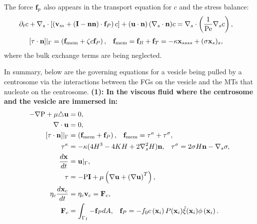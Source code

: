 \documentclass[11pt]{article}
\newcommand{\ff}{\mathbf{f}}
\newcommand{\xx}{\mathbf{x}}
\begin{document}
The force ${\bf f}_p$ also appears in the transport equation  for $c$ and the stress balance:
 \begin{align}
 \label{eq:c_new}
\partial_t c + \nabla_s\cdot \left[ \left({\bf v}_m + \left({\bf I}-{\bf n}{\bf n}\right)\cdot {\bf f}_{P}\right)c\right] + \left({\bf u}\cdot{\bf n}\right) (\nabla_s \cdot{\bf n}) c &= \nabla_s\cdot\left(\frac{1}{\mbox{Pe}}\nabla_s c\right),
\end{align}
\begin{align}
\left[ \tau\cdot{\bf n}\right]\rvert_{\Gamma}  &= \left({\bf f}_{\text{mem}} + \zeta c {\bf f}_P\right),\;\;\; \ff_{\text{mem}} = \ff_B + \ff_T = -\kappa \xx_{ssss} + (\sigma \xx_s)_s, 
\end{align}
where the bulk exchange terms are being neglected.

In summary, below are the governing equations for a vesicle being pulled by a centrosome via the interactions between the FGs on the vesicle and the MTs that nucleate on the centrosome.
%
%
%
\noindent
{\bf (1):  In the viscous fluid where the centrosome and the vesicle are immersed in:}
 \begin{align}
-\nabla \mbox{P} + \mu \triangle {\bf u} &=0,\\
\nabla\cdot{\bf u} & =0,\\
 \left[ \tau\cdot{\bf n}\right]\rvert_{\Gamma} &= \left({\bf f}_{\text{mem}} +{\bf f}_P\right),\;\;\; \ff_{\text{mem}} ={\bf \tau}^{\kappa} + {\bf \tau}^{\sigma},\\
 {\bf \tau}^{\kappa} &= -\kappa(4 H^3 - 4 K H + 2 \nabla^2_s H){\bf n},\;\;\;
 {\bf \tau}^{\sigma} = 2 \sigma H {\bf n} - \nabla_s \sigma,\\
\label{eq:kinematics}
\frac{d{\bf x}}{dt} &= {\bf u}\rvert_{\Gamma},\\
\tau &= -\mbox{P} {\bf I} + \mu \left(\nabla {\bf u} + \left(\nabla {\bf u}\right)^T\right),\\
\eta_c\frac{d {\bf x}_c}{dt} &= \eta_c {\bf v}_c = {\bf F}_c,\\
{\bf F}_c &=  \int_{\Gamma_I}  -\ff_P dA,\;\;\; \ff_P = -f_0 c\left({\bf x}_i\right)P({\bf x}_i)\hat\xi({\bf x}_i) \phi\left({\bf x}_i\right).
\end{align}
\end{document}

